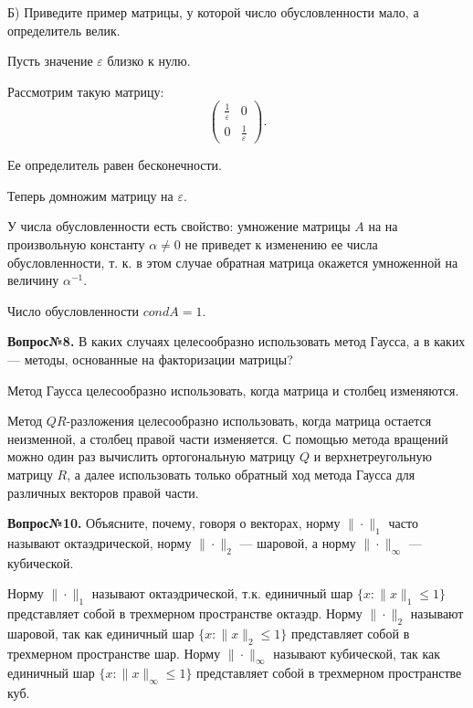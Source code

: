 \documentclass{article}
\begin{document}
 Б) Приведите пример матрицы, у которой число обусловленности мало, а определитель велик.
 
 Пусть значение $\varepsilon$ близко к нулю.
 
 Рассмотрим такую матрицу:
 \[
 \begin{pmatrix}
 	\frac{1}{\varepsilon} & 0\\
 	0 & \frac{1}{\varepsilon}
 \end{pmatrix}.
 \]
 
 Ее определитель равен бесконечности.
 
 Теперь домножим матрицу на $\varepsilon$.
 
У числа обусловленности есть свойство: умножение матрицы $A$ на на произвольную
константу $\alpha \ne 0$ не приведет к изменению ее числа обусловленности, т. к. в этом случае обратная матрица окажется умноженной
на величину $\alpha^{-1}$.

Число обусловленности $cond A = 1$.

\textbf{Вопрос№8.} В каких случаях целесообразно использовать метод Гаусса, а в каких — методы, основанные на факторизации матрицы?

Метод Гаусса целесообразно использовать, когда матрица и столбец изменяются. 

Метод $QR$-разложения целесообразно использовать, когда матрица остается неизменной, а столбец правой части изменяется. С помощью метода вращений можно один раз вычислить ортогональную матрицу $Q$ и верхнетреугольную матрицу $R$, а далее использовать только обратный ход метода Гаусса для различных векторов правой части.

 \textbf{Вопрос№10.} Объясните, почему, говоря о векторах, норму $\|\cdot\|_1$ часто называют октаэдрической, норму $\|\cdot\|_2$ — шаровой, а норму $\|\cdot\|_{\infty}$ — кубической. 

Норму $\|\cdot\|_1$ называют октаэдрической, т.к. единичный шар ${\{ x: \|x\|_1 \leq 1\}}$ представляет собой в трехмерном пространстве октаэдр. Норму $\|\cdot\|_2$ называют шаровой, так как единичный шар $\{ x: \|x\|_2 \leq 1\}$ представляет собой в трехмерном пространстве шар. Норму $\|\cdot\|_{\infty}$ называют кубической, так как единичный шар $\{ x: \|x\|_{\infty} \leq 1\}$ представляет собой в трехмерном пространстве куб.
\end{document}
